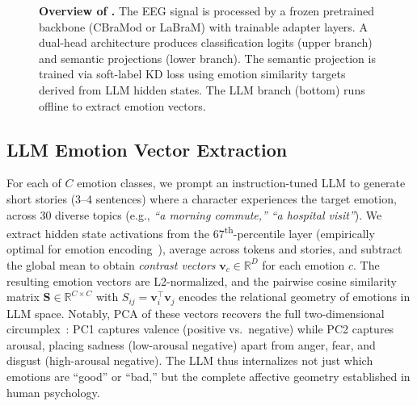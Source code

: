 \begin{figure}[!t]
{
    }
    \caption{\textbf{Overview of \ours.} The EEG signal is processed by a frozen pretrained backbone (CBraMod or LaBraM) with trainable adapter layers. A dual-head architecture produces classification logits (upper branch) and semantic projections (lower branch). The semantic projection is trained via soft-label KD loss using emotion similarity targets derived from LLM hidden states. The LLM branch (bottom) runs offline to extract emotion vectors.}
    \label{fig:pipeline}
\end{figure}

\subsection{LLM Emotion Vector Extraction}
\label{sec:llm_vectors}
\vspace{-1mm}

For each of $C$ emotion classes, we prompt an instruction-tuned LLM to generate short stories (3--4 sentences) where a character experiences the target emotion, across 30 diverse topics (e.g., \emph{``a morning commute,''} \emph{``a hospital visit''}). We extract hidden state activations from the 67\textsuperscript{th}-percentile layer (empirically optimal for emotion encoding~\cite{tak2025emotion_interpretability}), average across tokens and stories, and subtract the global mean to obtain \emph{contrast vectors} $\mathbf{v}_c \in \mathbb{R}^D$ for each emotion $c$. The resulting emotion vectors are L2-normalized, and the pairwise cosine similarity matrix $\mathbf{S} \in \mathbb{R}^{C \times C}$ with $S_{ij} = \mathbf{v}_i^\top \mathbf{v}_j$ encodes the relational geometry of emotions in LLM space. Notably, PCA of these vectors recovers the full two-dimensional circumplex~\cite{russell1980circumplex}: PC1 captures valence (positive vs.\ negative) while PC2 captures arousal, placing sadness (low-arousal negative) apart from anger, fear, and disgust (high-arousal negative). The LLM thus internalizes not just which emotions are ``good'' or ``bad,'' but the complete affective geometry established in human psychology.

